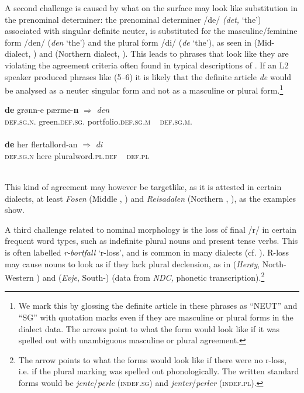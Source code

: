 \documentclass[output=paper,colorlinks,citecolor=brown,modfonts,nonflat]{../langscibook}
\begin{document}
A second challenge is caused by what on the surface may look like substitution in the prenominal determiner: the prenominal determiner /de/ \textit{(det,} ‘the’) associated with singular definite neuter, is substituted for the masculine/feminine form /den/ (\textit{den} ‘the’) and the plural form /di/ (\textit{de} ‘the’), as seen in  (Mid- dialect, \citealt[46]{EideEtAl2017}) and  (Northern  dialect, \citealt{Sollid2014}). This leads to phrases that look like they are violating the agreement criteria often found in typical descriptions of . If an L2 speaker produced phrases like (5–6) it is likely that the definite article \textit{de} would be analysed as a neuter singular form and not as a masculine  or plural  form.\footnote{{We mark this by glossing the definite article in these phrases as “NEUT” and “SG” with quotation marks even if they are masculine or plural forms in the dialect data. The arrows point to what the form would look like if it was spelled out with unambiguous masculine or plural agreement.}}



\ea%
    \label{ex:emilsen:5}
\gll \textbf{de} grønn-e pærme-\textbf{n} ${\Rightarrow}$ \textit{den}\\
 \textsc{def}.\textsc{sg}.\textsc{n}. green.\textsc{def}.\textsc{sg}. portfolio.\textsc{def}.\textsc{sg}.{\textsc{m}} ~ \textsc{def}.\textsc{sg}.\textsc{m}.\\
  \\

\ex%
    \label{ex:emilsen:6}
\gll \textbf{de} her flertallord-an ${\Rightarrow}$ \textit{di}\\
 \textsc{def}.\textsc{sg}.\textsc{n} here pluralword.\textsc{pl.def} ~ \textsc{def.pl}\\
  \\
\z


This kind of agreement may however be targetlike, as it is attested in certain  dialects, at least \textit{Fosen} (Middle , ) and \textit{Reisadalen} (Northern , ), as the examples show.

A third challenge related to nominal morphology is the loss of final /r/ in certain frequent word types, such as indefinite plural nouns and present tense verbs. This is often labelled \textit{r-bortfall} ‘r-loss’, and is common in many dialects (cf. \citealt[53]{MæhlumRøyneland2012}). R-loss may cause nouns to look as if they lack plural declension, as in  (\textit{Herøy}, North-Western ) and  (\textit{Evje}, South-) (data from \textit{NDC,} phonetic transcription).\footnote{{The arrow points to what the forms would look like if there were no r-loss, i.e. if the plural marking was spelled out phonologically. The written standard forms would be} {\textit{jente}}{/}{\textit{perle}} {(\textsc{indef.sg}) and} {\textit{jenter}}{/}{\textit{perler}} {(\textsc{indef.pl}).}}
\end{document}

